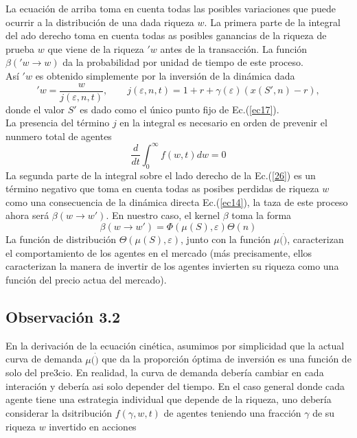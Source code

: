 \documentclass[12pt,a4paper]{article}
\begin{document}
\begin{itemize}
\begin{equation}
\end{equation}
La ecuación de arriba toma en cuenta todas las posibles variaciones que puede ocurrir a la distribución de una dada riqueza $w$. La primera parte de la integral del ado derecho toma en cuenta todas as posibles ganancias de la riqueza de prueba $w$ que viene de la riqueza $'w$ antes de la transacción. La función $\beta('w\rightarrow w)$ da la probabilidad por unidad de tiempo de este proceso.\\
\quad Así $'w$ es obtenido simplemente por la inversión de la dinámica dada
\begin{equation}
'w=\frac{w}{j(\varepsilon,n,t)}, \quad \quad j(\varepsilon,n,t)=1+r+\gamma(\varepsilon)(x(S',n)-r),
\end{equation} 
donde el valor $S'$ es dado como el único  punto fijo de Ec.(\ref{ec17}).\\
\quad La presencia del término $j$ en la integral es necesario en orden de prevenir el nunmero total de agentes 
\begin{equation}
\frac{d}{dt} \int^{\infty}_{0} f(w,t)dw=0
\end{equation}
La segunda parte de la integral sobre el lado derecho de la Ec.(\ref{26}) es un término negativo que toma en cuenta todas as posibes perdidas de riqueza $w$ como una consecuencia de la dinámica directa Ec.(\ref{ec14}), la taza de este proceso ahora será $\beta(w\rightarrow w')$. En nuestro caso, el kernel $\beta$ toma la forma
\begin{equation}
\beta(w\rightarrow w') = \Phi(\mu(S),\varepsilon)\Theta(n)
\end{equation}
La función de distribución $\Theta (\mu(S),\varepsilon)$, junto con la función $\mu(\dot)$, caracterizan el comportamiento de los agentes en el mercado (más precisamente, ellos caracterizan la manera de invertir de los agentes invierten su riqueza como una función del precio actua del mercado).
\subsection*{Observación 3.2} En la derivación de la ecuación cinética, asumimos por simplicidad que la actual curva de demanda $\mu(\dot)$ que da la proporción óptima de inversión es una función de solo del pre3cio. En realidad, la curva de demanda debería cambiar en cada interación y debería asi solo depender del tiempo. En el caso general donde cada agente tiene una estrategia individual que depende de la riqueza, uno debería considerar la dsitribución $f(\gamma,w,t)$ de agentes teniendo una fracción $\gamma$ de su riqueza $w$ invertido en acciones
\end{itemize}
\end{document}
